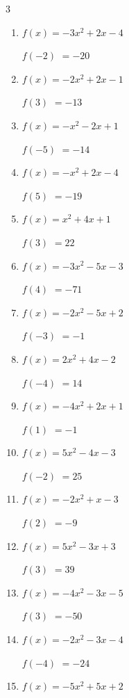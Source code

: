 \begin{multicols}{3}
\begin{enumerate}
$f(-3)$
        $= 22$

\columnbreak %

\resetques

  \item $f(x)=-3x^{2}+2x-4$

$f(-2)$
        $= -20$

  \item $f(x)=-2x^{2}+2x-1$

$f(3)$
        $= -13$

  \item $f(x)=-x^{2}-2x+1$

$f(-5)$
        $= -14$

  \item $f(x)=-x^{2}+2x-4$

$f(5)$
        $= -19$

  \item $f(x)=x^{2}+4x+1$

$f(3)$
        $= 22$

  \item $f(x)=-3x^{2}-5x-3$

$f(4)$
        $= -71$

  \item $f(x)=-2x^{2}-5x+2$

$f(-3)$
        $= -1$

  \item $f(x)=2x^{2}+4x-2$

$f(-4)$
        $= 14$

  \item $f(x)=-4x^{2}+2x+1$

$f(1)$
        $= -1$

  \item $f(x)=5x^{2}-4x-3$

$f(-2)$
        $= 25$

  \item $f(x)=-2x^{2}+x-3$

$f(2)$
        $= -9$

  \item $f(x)=5x^{2}-3x+3$

$f(3)$
        $= 39$

  \item $f(x)=-4x^{2}-3x-5$

$f(3)$
        $= -50$

  \item $f(x)=-2x^{2}-3x-4$

$f(-4)$
        $= -24$

  \item $f(x)=-5x^{2}+5x+2$


\end{enumerate}
\end{multicols}
